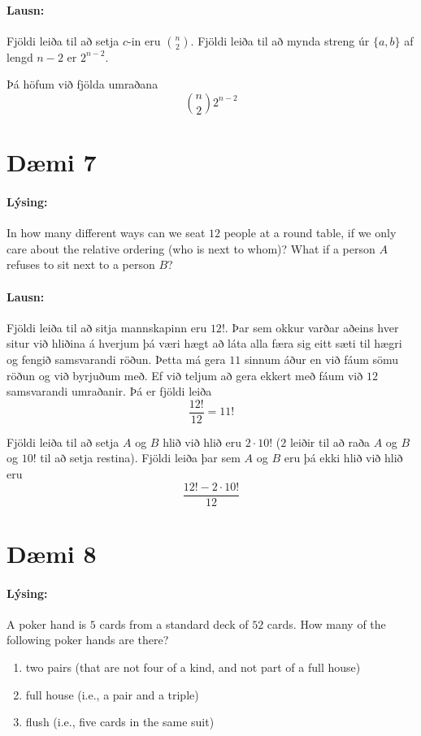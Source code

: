 \documentclass[a4paper,notitlepage]{article}
\theoremstyle{plain}
\theoremstyle{definition}
\begin{document}
\paragraph{Lausn:}
Fjöldi leiða til að setja $c$-in eru $\binom{n}{2}$. Fjöldi leiða til að mynda streng úr $\{a,b\}$ af lengd $n-2$ er $2^{n-2}$.

Þá höfum við fjölda umraðana
\begin{equation*}
    \binom{n}{2} 2^{n-2}
\end{equation*}

\section*{Dæmi 7}
\paragraph{Lýsing:} In how many different ways can we seat $12$ people at a round table, if we only care about the relative ordering (who is next to whom)? What if a person $A$ refuses to sit next to a person $B$?

\paragraph{Lausn:}
Fjöldi leiða til að sitja mannskapinn eru $12!$. Þar sem okkur varðar aðeins hver situr við hliðina á 
hverjum þá væri hægt að láta alla færa sig eitt sæti til hægri og fengið samsvarandi röðun. 
Þetta má gera $11$ sinnum áður en við fáum sömu röðun og við byrjuðum með. Ef við teljum að gera ekkert með fáum við $12$ samsvarandi umraðanir.
 Þá er fjöldi leiða
\begin{equation*}
    \frac{12!}{12} = 11!
\end{equation*}

Fjöldi leiða til að setja $A$ og $B$ hlið við hlið eru $2\cdot 10!$ ($2$ leiðir til að raða $A$ og $B$ og $10!$ til að setja restina). Fjöldi leiða þar sem $A$ og $B$ eru þá ekki hlið við hlið eru
\begin{equation*}
    \frac{12!-2\cdot 10!}{12}
\end{equation*}

\newpage

\section*{Dæmi 8}
\paragraph{Lýsing:}
A poker hand is $5$ cards from a standard deck of $52$ cards. How many of the following poker hands are there?
\begin{enumerate}
    \item two pairs (that are not four of a kind, and not part of a full house)
    \item full house (i.e., a pair and a triple)
    \item flush (i.e., five cards in the same suit)
\end{enumerate}
\end{document}
